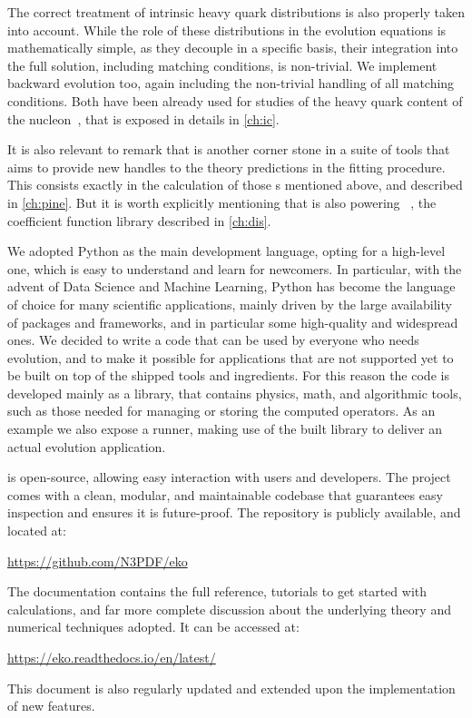 The correct treatment of intrinsic heavy quark distributions is also properly
taken into account.
While the role of these distributions in the evolution equations is
mathematically simple, as they decouple in a specific basis, their integration
into the full solution, including matching conditions, is non-trivial.
We implement backward evolution too, again including the non-trivial handling
of all matching conditions.
Both have been already used for studies of the heavy quark content of the
nucleon~\cite{Ball:2022qks}, that is exposed in details in \cref{ch:ic}.

It is also relevant to remark that \eko is another corner stone in a suite of
tools that aims to provide new handles to the theory predictions in the \pdf
fitting procedure.
This consists exactly in the calculation of those \fktab{}s mentioned above,
and described in \cref{ch:pine}.
But it is worth explicitly mentioning that \eko is also powering
\yadism~\cite{yadism}, the \dis coefficient function library described in
\cref{ch:dis}.

We adopted Python as the main development language, opting for a high-level
one, which is easy to understand and learn for newcomers.
In particular, with the advent of Data Science and Machine Learning, Python has
become the language of choice for many scientific applications, mainly driven
by the large availability of packages and frameworks, and in particular some
high-quality and widespread ones.
We decided to write a code that can be used by everyone who needs \qcd
evolution, and to make it possible for applications that are not supported yet
to be built on top of the shipped tools and ingredients.
For this reason the code is developed mainly as a library, that contains
physics, math, and algorithmic tools, such as those needed for managing or
storing the computed operators.
As an example we also expose a runner, making use of the built library to
deliver an actual evolution application. 
\newline

\eko is open-source, allowing easy interaction with users and developers.
The project comes with a clean, modular, and maintainable codebase that
guarantees easy inspection and ensures it is future-proof.
The repository is publicly available, and located at:
\begin{center}
\url{https://github.com/N3PDF/eko}
\end{center}
The \eko documentation contains the full \api reference, tutorials to get
started with \eko calculations, and far more complete discussion about the
underlying theory and numerical techniques adopted.
It can be accessed at:
\begin{center}
\url{https://eko.readthedocs.io/en/latest/}
\end{center}
This document is also regularly updated and extended upon the
implementation of new features.
